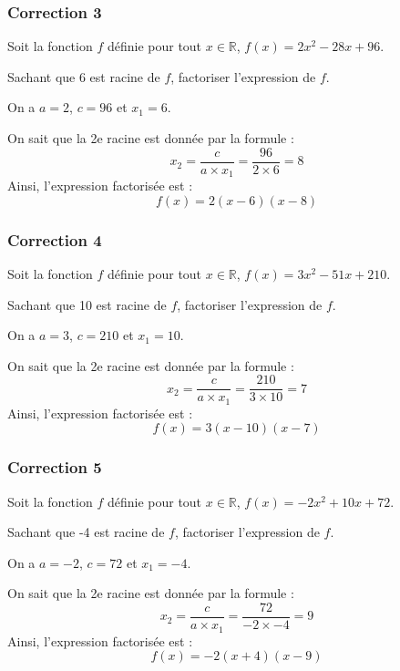 \documentclass[15pt, mathserif]{beamer}
\newcommand{\R}{\mathbb{R}}			%
\begin{document}
\begin{frame}
\vspace{-10mm}
	\frametitle{Correction 3}
Soit la fonction $f$ définie pour tout $x \in \R$, $f(x)=2x^2-28x+96$. 
 
 Sachant que 6 est racine de $f$, factoriser l'expression de $f$. 
 
 On a $a=2$, $c=96$ et $x_1=6$. 
 
 On sait que la 2e racine est donnée par la formule : $$x_2=\dfrac{c}{a \times x_1}=\dfrac{96}{2\times 6}=8$$ Ainsi, l'expression factorisée est : $$f(x)=2(x-6)(x-8)$$ 
 \end{frame}


\begin{frame}
\vspace{-10mm}
	\frametitle{Correction 4}
Soit la fonction $f$ définie pour tout $x \in \R$, $f(x)=3x^2-51x+210$. 
 
 Sachant que 10 est racine de $f$, factoriser l'expression de $f$. 
 
 On a $a=3$, $c=210$ et $x_1=10$. 
 
 On sait que la 2e racine est donnée par la formule : $$x_2=\dfrac{c}{a \times x_1}=\dfrac{210}{3\times 10}=7$$ Ainsi, l'expression factorisée est : $$f(x)=3(x-10)(x-7)$$ 
 \end{frame}


\begin{frame}
\vspace{-10mm}
	\frametitle{Correction 5}
Soit la fonction $f$ définie pour tout $x \in \R$, $f(x)=-2x^2+10x+72$. 
 
 Sachant que -4 est racine de $f$, factoriser l'expression de $f$. 
 
 On a $a=-2$, $c=72$ et $x_1=-4$. 
 
 On sait que la 2e racine est donnée par la formule : $$x_2=\dfrac{c}{a \times x_1}=\dfrac{72}{-2\times -4}=9$$ Ainsi, l'expression factorisée est : $$f(x)=-2(x+4)(x-9)$$ 
 \end{frame}
\end{document}
